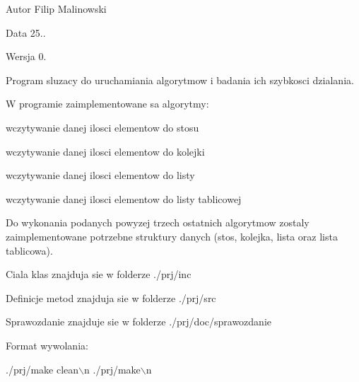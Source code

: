 \begin{DoxyAuthor}{Autor}
Filip Malinowski 
\end{DoxyAuthor}
\begin{DoxyDate}{Data}
25.. 
\end{DoxyDate}
\begin{DoxyVersion}{Wersja}
0.
\end{DoxyVersion}
Program sluzacy do uruchamiania algorytmow i badania ich szybkosci dzialania.\par
W programie zaimplementowane sa algorytmy\-:\par

\begin{DoxyItemize}
\item wczytywanie danej ilosci elementow do stosu\par

\item wczytywanie danej ilosci elementow do kolejki\par

\item wczytywanie danej ilosci elementow do listy\par

\item wczytywanie danej ilosci elementow do listy tablicowej
\end{DoxyItemize}

Do wykonania podanych powyzej trzech ostatnich algorytmow zostaly zaimplementowane potrzebne struktury danych (stos, kolejka, lista oraz lista tablicowa).\par
\par
Ciala klas znajduja sie w folderze ./prj/inc\par
Definicje metod znajduja sie w folderze ./prj/src\par
Sprawozdanie znajduje sie w folderze ./prj/doc/sprawozdanie\par
\par
Format wywolania\-:\par

\begin{DoxyCode}
./prj/make clean\(\backslash\)n
./prj/make\(\backslash\)n
\end{DoxyCode}
 